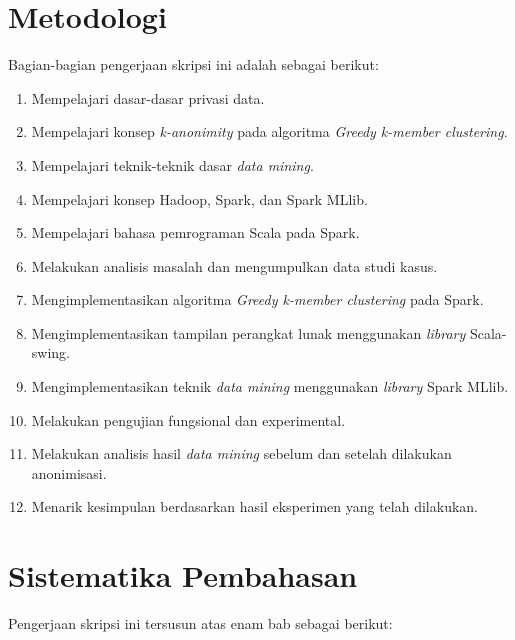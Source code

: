 \section{Metodologi}
\label{sec:metlit}
Bagian-bagian pengerjaan skripsi ini adalah sebagai berikut:
\begin{enumerate}
\item Mempelajari dasar-dasar privasi data.
\item Mempelajari konsep {\it k-anonimity} pada algoritma {\it Greedy k-member clustering}.
\item Mempelajari teknik-teknik dasar {\it data mining}.
\item Mempelajari konsep Hadoop, Spark, dan Spark MLlib.
\item Mempelajari bahasa pemrograman Scala pada Spark.
\item Melakukan analisis masalah dan mengumpulkan data studi kasus.
\item Mengimplementasikan algoritma {\it Greedy k-member clustering } pada Spark.
\item Mengimplementasikan tampilan perangkat lunak menggunakan {\it library} Scala-swing.
\item Mengimplementasikan teknik {\it data mining} menggunakan {\it library} Spark MLlib.
\item Melakukan pengujian fungsional dan experimental.
\item Melakukan analisis hasil {\it data mining} sebelum dan setelah dilakukan anonimisasi.
\item Menarik kesimpulan berdasarkan hasil eksperimen yang telah dilakukan.
\end{enumerate}

\newpage
\section{Sistematika Pembahasan}
\label{sec:sispem}
Pengerjaan skripsi ini tersusun atas enam bab sebagai berikut:

